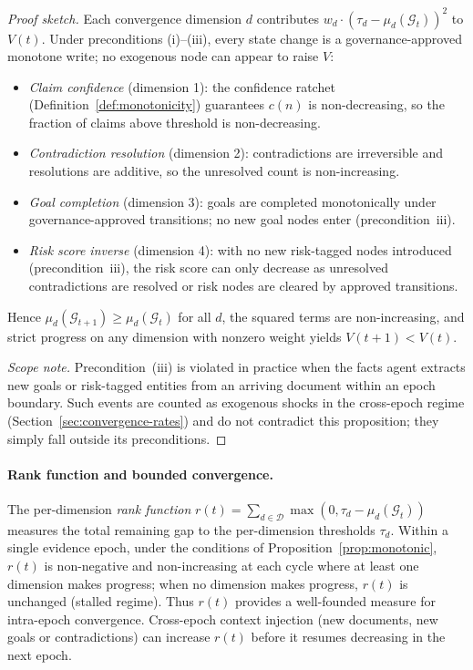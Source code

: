 \documentclass[11pt]{article}
\begin{document}
\begin{proof}[Proof sketch]
Each convergence dimension $d$ contributes $w_d \cdot (\tau_d - \mu_d(\mathcal{G}_t))^2$ to $V(t)$. Under preconditions (i)--(iii), every state change is a governance-approved monotone write; no exogenous node can appear to raise $V$:
\begin{itemize}
  \item \emph{Claim confidence} (dimension 1): the confidence ratchet (Definition~\ref{def:monotonicity}) guarantees $c(n)$ is non-decreasing, so the fraction of claims above threshold is non-decreasing.
  \item \emph{Contradiction resolution} (dimension 2): contradictions are irreversible and resolutions are additive, so the unresolved count is non-increasing.
  \item \emph{Goal completion} (dimension 3): goals are completed monotonically under governance-approved transitions; no new goal nodes enter (precondition~iii).
  \item \emph{Risk score inverse} (dimension 4): with no new risk-tagged nodes introduced (precondition~iii), the risk score can only decrease as unresolved contradictions are resolved or risk nodes are cleared by approved transitions.
\end{itemize}
Hence $\mu_d(\mathcal{G}_{t+1}) \geq \mu_d(\mathcal{G}_t)$ for all $d$, the squared terms are non-increasing, and strict progress on any dimension with nonzero weight yields $V(t+1) < V(t)$.

\emph{Scope note.} Precondition~(iii) is violated in practice when the facts agent extracts new goals or risk-tagged entities from an arriving document within an epoch boundary. Such events are counted as exogenous shocks in the cross-epoch regime (Section~\ref{sec:convergence-rates}) and do not contradict this proposition; they simply fall outside its preconditions.
\end{proof}

\paragraph{Rank function and bounded convergence.} The per-dimension \emph{rank function}
$r(t) = \sum_{d \in \mathcal{D}} \max(0, \tau_d - \mu_d(\mathcal{G}_t))$
measures the total remaining gap to the per-dimension thresholds $\tau_d$. Within a single evidence epoch, under the conditions of Proposition~\ref{prop:monotonic}, $r(t)$ is non-negative and non-increasing at each cycle where at least one dimension makes progress; when no dimension makes progress, $r(t)$ is unchanged (stalled regime). Thus $r(t)$ provides a well-founded measure for intra-epoch convergence. Cross-epoch context injection (new documents, new goals or contradictions) can increase $r(t)$ before it resumes decreasing in the next epoch.
\end{document}
